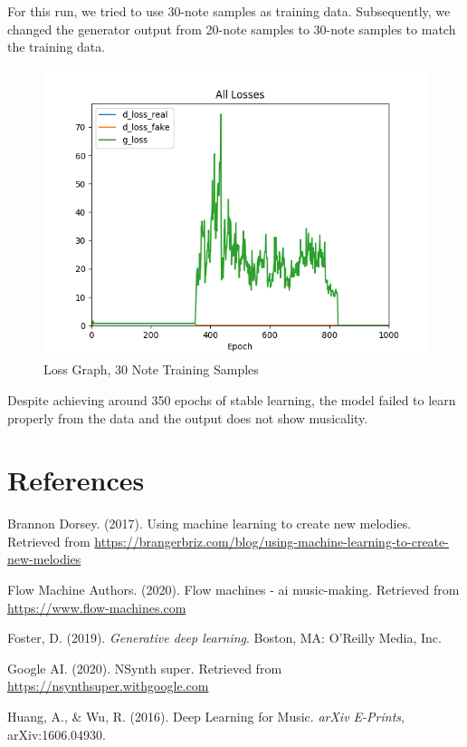 \documentclass[12pt,oneside]{chicagocapstone}
\begin{document}
For this run, we tried to use 30-note samples as training data. Subsequently, we changed the generator output from 20-note samples to 30-note samples to match the training data.
\begin{figure}

{\centering \includegraphics[width=0.3\linewidth]{figure/ap_30notes} 

}

\caption{Loss Graph, 30 Note Training Samples}\label{fig:unnamed-chunk-14}
\end{figure}
Despite achieving around 350 epochs of stable learning, the model failed to learn properly from the data and the output does not show musicality.

\backmatter

\hypertarget{references}{%
\chapter*{References}\label{references}}


\noindent

\setlength{\parindent}{-0.20in}
\setlength{\leftskip}{0.20in}
\setlength{\parskip}{8pt}

\hypertarget{refs}{}
\leavevmode\hypertarget{ref-dorsey2017}{}%
Brannon Dorsey. (2017). Using machine learning to create new melodies. Retrieved from \url{https://brangerbriz.com/blog/using-machine-learning-to-create-new-melodies}

\leavevmode\hypertarget{ref-flow_machines}{}%
Flow Machine Authors. (2020). Flow machines - ai music-making. Retrieved from \url{https://www.flow-machines.com}

\leavevmode\hypertarget{ref-foster2019}{}%
Foster, D. (2019). \emph{Generative deep learning}. Boston, MA: O'Reilly Media, Inc.

\leavevmode\hypertarget{ref-nsynth}{}%
Google AI. (2020). NSynth super. Retrieved from \url{https://nsynthsuper.withgoogle.com}

\leavevmode\hypertarget{ref-2016arXiv160604930H}{}%
Huang, A., \& Wu, R. (2016). Deep Learning for Music. \emph{arXiv E-Prints}, arXiv:1606.04930.
\end{document}

